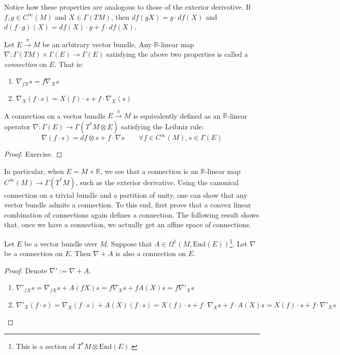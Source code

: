 Notice how these properties are analogous to those of the exterior derivative. If $f,g\in C^\infty(M)$ and $X\in\Gamma(TM)$, then $df(gX)=g\cdot df(X)$ and $d(f\cdot g)(X)=df(X)\cdot g+f\cdot df(X)$.
\begin{definition}\label{def:linearConnection}
  Let $E\xrightarrow{\pi}M$ be an arbitrary vector bundle. Any $\mathbb{R}$-linear map $\nabla:\Gamma(TM)\times\Gamma(E)\to\Gamma(E)$ satisfying the above two properties is called a \emph{connection} on $E$. That is:
  \begin{enumerate}
    \item $\nabla_{fX}s=f\nabla_Xs$
    \item $\nabla_X(f\cdot s)=X(f)\cdot s+f\cdot\nabla_X(s)$
  \end{enumerate}
\end{definition}
\begin{proposition}
    A connection on a vector bundle $E\xrightarrow{\pi}M$ is equivalently defined as an $\mathbb{R}$-linear operator $\nabla:\Gamma(E)\to\Gamma(T^*M\otimes E)$ satisfying the Leibniz rule:
    \begin{equation}
        \nabla (f\cdot s) = df\otimes s + f\cdot\nabla s\quad\quad\forall f\in C^\infty(M), s\in\Gamma(E)
    \end{equation}
\end{proposition}
\begin{proof}
    Exercise.
\end{proof}
In particular, when $E=M\times\mathbb{R}$, we see that a connection is an $\mathbb{R}$-linear map $C^\infty(M)\to \Gamma(T^*M)$, such as the exterior derivative. Using the canonical connection on a trivial bundle and a partition of unity, one can show that any vector bundle admits a connection. To this end, first prove that a convex linear combination of connections again defines a connection. The following result shows that, once we have a connection, we actually get an affine space of connections.
\begin{proposition}
  Let $E$ be a vector bundle over $M$. Suppose that $A\in\Omega^1(M, \text{End}(E))$\footnote{This is a section of $T^*M\otimes\text{End}(E)$.}. Let $\nabla$ be a connection on $E$. Then $\nabla + A$ is also a connection on $E$.
\end{proposition}
\begin{proof}
  Denote $\nabla':=\nabla+A$.
  \begin{enumerate}
    \item $\nabla'_{fX}s=\nabla_{fX}s+A(fX)s=f\nabla_Xs+fA(X)s=f\nabla'_Xs$
    \item $\nabla'_X(f\cdot s)=\nabla_X(f\cdot s)+A(X)(f\cdot s)=X(f)\cdot s+f\cdot\nabla_Xs+f\cdot A(X)s=X(f)\cdot s+f\cdot\nabla'_Xs$
  \end{enumerate}
\end{proof}

